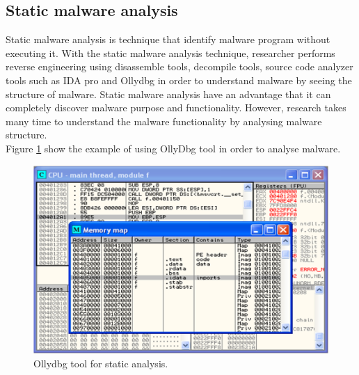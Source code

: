\subsection{Static malware analysis}
Static malware analysis is technique that identify malware program without executing it. With the static malware analysis technique, researcher performs reverse engineering using disassemble tools, decompile tools, source code analyzer tools such as IDA pro and Ollydbg in order to understand malware by seeing the structure of malware. Static malware analysis have an advantage that it can completely discover malware purpose and functionality. However, research takes many time to understand the malware functionality by analysing malware structure.\\
Figure \ref{fig:OllyDbg} show the example of using OllyDbg tool in order to analyse malware. 
\begin{figure}[h!]
\centering
\includegraphics[width=1\textwidth]{graph/OllyDbg.png}
\caption{Ollydbg tool for static analysis.}
\label{fig:OllyDbg}
\end{figure}
